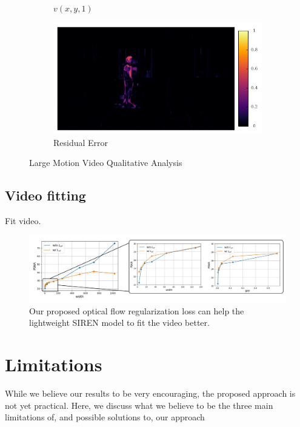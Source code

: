 \documentclass{article}
\begin{document}
\begin{figure}[h]
\begin{subfigure}{0.2\textwidth}
    \caption{$v(x,y,1)$}
\end{subfigure}%
\begin{subfigure}{0.2\textwidth}
	\centering
    \includegraphics[width=1\linewidth]{nd_scene/Skating_error.png}
    \caption{Residual Error}
\end{subfigure}
\caption{Large Motion Video Qualitative Analysis}
\end{figure}


\subsection{Video fitting}

Fit video.

\label{sec_video_fit}
\begin{figure}[h]
\centering
\includegraphics[width=1\textwidth]{compression.png}
\caption{Our proposed optical flow regularization loss can help the lightweight SIREN model to fit the video better.}
\end{figure}


\section{Limitations}

While we believe our results to be very encouraging, the proposed approach is not yet practical.
Here, we discuss what we believe to be the three main limitations of, and possible solutions to, our approach
\end{document}
